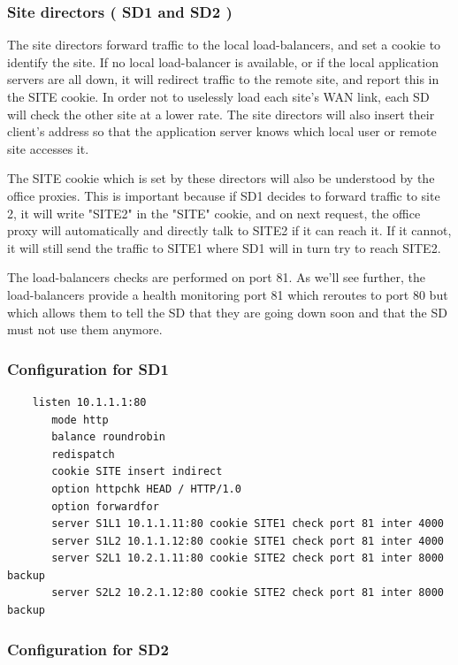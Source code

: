 \subsubsection{Site directors ( SD1 and SD2 )}

The site directors forward traffic to the local load-balancers, and set a
cookie to identify the site. If no local load-balancer is available, or if
the local application servers are all down, it will redirect traffic to the
remote site, and report this in the SITE cookie. In order not to uselessly
load each site's WAN link, each SD will check the other site at a lower
rate. The site directors will also insert their client's address so that
the application server knows which local user or remote site accesses it.

The SITE cookie which is set by these directors will also be understood
by the office proxies. This is important because if SD1 decides to forward
traffic to site 2, it will write "SITE2" in the "SITE" cookie, and on next
request, the office proxy will automatically and directly talk to SITE2 if
it can reach it. If it cannot, it will still send the traffic to SITE1
where SD1 will in turn try to reach SITE2.

The load-balancers checks are performed on port 81. As we'll see further,
the load-balancers provide a health monitoring port 81 which reroutes to
port 80 but which allows them to tell the SD that they are going down soon
and that the SD must not use them anymore.


\subsubsection{Configuration for SD1}

\begin{verbatim}
    listen 10.1.1.1:80
       mode http
       balance roundrobin
       redispatch
       cookie SITE insert indirect
       option httpchk HEAD / HTTP/1.0
       option forwardfor
       server S1L1 10.1.1.11:80 cookie SITE1 check port 81 inter 4000
       server S1L2 10.1.1.12:80 cookie SITE1 check port 81 inter 4000
       server S2L1 10.2.1.11:80 cookie SITE2 check port 81 inter 8000 backup
       server S2L2 10.2.1.12:80 cookie SITE2 check port 81 inter 8000 backup
\end{verbatim}

\subsubsection{Configuration for SD2}

